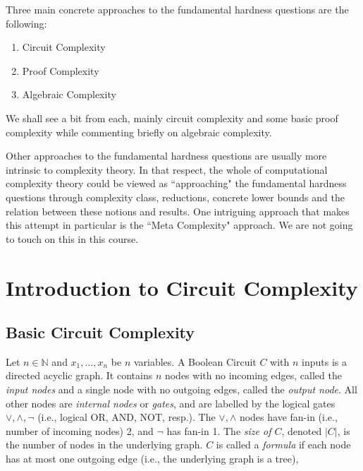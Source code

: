 Three main concrete approaches to the fundamental hardness questions are the following:

\begin{enumerate}
\item  Circuit Complexity 
\item Proof Complexity 
\item Algebraic Complexity
\end{enumerate}

We shall see a bit from each, mainly circuit complexity and some basic proof complexity while commenting briefly on algebraic complexity. 



Other approaches to the fundamental hardness questions are usually more intrinsic to complexity theory. In that respect, the whole of computational complexity theory could be viewed as ``approaching" the fundamental hardness questions through complexity class, reductions, concrete lower bounds and the relation between these notions and results. One intriguing approach that makes this attempt in particular is the ``Meta Complexity" approach. We are not going to touch on this in this course. 



\chapter{Introduction to Circuit Complexity}
\label{intro} %
 

\section{Basic Circuit Complexity}
\label{sec:2}

\begin{definition}
Let $n \in \mathbb{N}$ and $x_1, \ldots, x_n$ be $n$ variables. A Boolean Circuit $C$ with $n$ inputs is a directed acyclic graph. It contains $n$ nodes with no incoming edges, called the \emph{input nodes} and a single node with no outgoing edges, called the \emph{output node}.
All other nodes are \emph{internal nodes} or \emph{gates}, and
are labelled by the logical gates $\lor, \land,\neg$ (i.e., logical OR, AND, NOT, resp.). The $\lor,\land$ nodes have fan-in (i.e., number of incoming nodes) 2, and $\neg$ has fan-in 1. The \emph{size of $C$}, denoted $|C|$, is the number of nodes in the underlying graph.
$C$ is called a \emph{formula} if each node has at most one outgoing edge (i.e., the underlying graph is a tree),
\end{definition}




